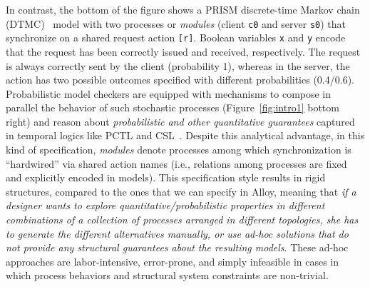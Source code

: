 \documentclass[10pt,journal,compsoc]{IEEEtran}
\begin{document}
In contrast, the bottom of the figure shows a PRISM discrete-time Markov chain (DTMC)~\cite{DBLP:conf/sfm/KwiatkowskaNP07} model with two processes or {\em modules} (client {\tt c0} and server {\tt s0}) that synchronize on a shared request action {\tt [r]}. 
Boolean variables {\tt x} and {\tt y} encode that the request has been correctly issued and received, respectively. 
The request is always correctly sent by the client (probability 1), whereas in the server, the action has two possible outcomes specified with different probabilities (0.4/0.6). 
Probabilistic model checkers are equipped with mechanisms to compose in parallel the behavior of such stochastic processes (Figure~\ref{fig:intro1} bottom right) and reason about {\it probabilistic and other quantitative guarantees} captured in temporal logics like PCTL and CSL~\cite{DBLP:conf/sfm/KwiatkowskaNP07}. 
Despite this analytical advantage, in this kind of specification, {\em modules} denote processes among which synchronization is ``hardwired'' via shared action names (i.e., relations among processes are fixed and explicitly encoded in models). 
This specification style results in rigid structures, compared to the ones that we can specify in Alloy, meaning that {\it if a designer wants to explore quantitative/probabilistic properties in different combinations of a collection of processes arranged in different topologies, she has to generate the different alternatives manually, or use ad-hoc solutions that do not provide any structural guarantees about the resulting models}. 
These ad-hoc approaches are labor-intensive, error-prone, and simply infeasible in cases in which process behaviors and structural system constraints are non-trivial.



\end{document}
